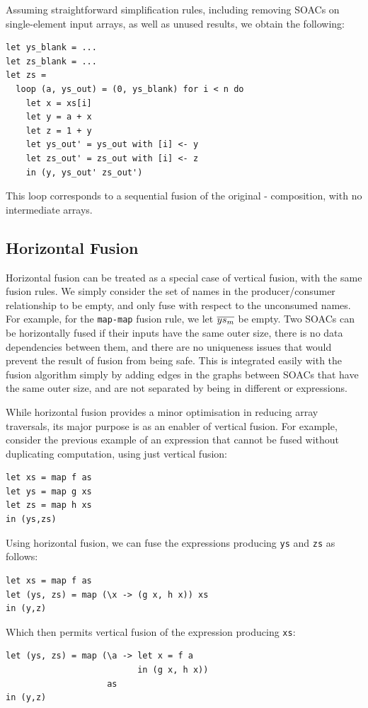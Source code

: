 Assuming straightforward simplification rules, including removing
SOACs on single-element input arrays, as well as unused 
results, we obtain the following:

\begin{lstlisting}
let ys_blank = ...
let zs_blank = ...
let zs =
  loop (a, ys_out) = (0, ys_blank) for i < n do
    let x = xs[i]
    let y = a + x
    let z = 1 + y
    let ys_out' = ys_out with [i] <- y
    let zs_out' = zs_out with [i] <- z
    in (y, ys_out' zs_out')
\end{lstlisting}

This loop corresponds to a sequential fusion of the original
- composition, with no intermediate arrays.

\subsection{Horizontal Fusion}
\label{sec:horizontal-fusion}

Horizontal fusion can be treated as a special case of vertical fusion,
with the same fusion rules.  We simply consider the set of names in
the producer/consumer relationship to be empty, and only fuse with
respect to the unconsumed names.  For example, for the
\lstinline{map-map} fusion rule, we let $\overline{ys_{m}}$ be empty.  Two
SOACs can be horizontally fused if their inputs have the same outer
size, there is no data dependencies between them, and there are no
uniqueness issues that would prevent the result of fusion from being
safe.  This is integrated easily with the fusion algorithm simply by
adding edges in the graphs between SOACs that have the same outer
size, and are not separated by being in different  or 
expressions.

While horizontal fusion provides a minor optimisation in reducing
array traversals, its major purpose is as an enabler of vertical
fusion.  For example, consider the previous example of an expression
that cannot be fused without duplicating computation, using just
vertical fusion:

\begin{lstlisting}
let xs = map f as
let ys = map g xs
let zs = map h xs
in (ys,zs)
\end{lstlisting}
\noindent Using horizontal fusion, we can fuse the expressions
producing \texttt{ys} and \texttt{zs} as follows:
\begin{lstlisting}
let xs = map f as
let (ys, zs) = map (\x -> (g x, h x)) xs
in (y,z)
\end{lstlisting}
\noindent Which then permits vertical fusion of the expression
producing \texttt{xs}:
\begin{lstlisting}
let (ys, zs) = map (\a -> let x = f a
                          in (g x, h x))
                    as
in (y,z)
\end{lstlisting}


